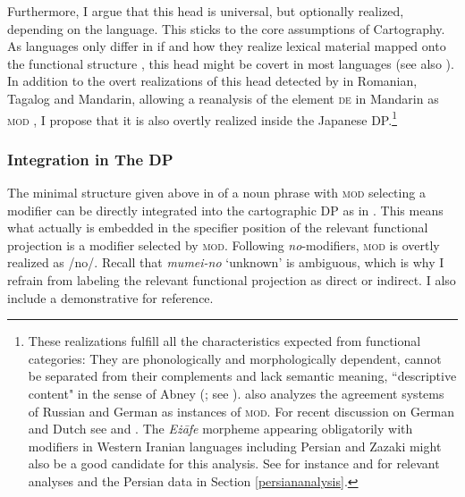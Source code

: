 Furthermore, I argue that this head is universal, but optionally realized, depending on the language. This sticks to the core assumptions of Cartography. As languages only differ in if and how they realize lexical material mapped onto the functional structure \citep{rizzi:1997:the, shlonsky:2004:form, bortolotto:2016:RA, cinriz:2010:carto, cinriz:2016:functional}, this head might be covert in most languages (see also \citealt{richards:2023:finding}). In addition to the overt realizations of this head detected by \citet[§ 2.2 and 2.3]{rubin:1994:mod} in  Romanian,  Tagalog and  Mandarin, allowing a reanalysis of the element \textsc{de} in Mandarin as \textsc{mod} \citep[97–102]{rubin:1994:mod}, I propose that it is also overtly realized inside the Japanese DP.\footnote{These realizations fulfill all the characteristics expected from functional categories: They are phonologically and morphologically dependent, cannot be separated from their complements and lack semantic meaning, ``descriptive content" in the sense of Abney (\citeyear[65–66]{abney:1987:the}; see \citealt[34]{rubin:1994:mod}). \citet[§ 2.2 and 2.3]{rubin:1994:mod} also analyzes the agreement systems of Russian and German as instances of \textsc{mod}. For recent discussion on German and Dutch see \citet{zeijlstra:2020:agree} and \citet{alexeyenko:2021:hff}. The \textit{E{\.z}āfe} morpheme appearing obligatorily with modifiers in Western Iranian languages including Persian and Zazaki might also be a good candidate for this analysis. See for instance \citet{toosarvandani:2014:the, franco:2015:linkers} and \citet{gn:2024:morpho} for relevant analyses and the Persian data in Section \ref{persiananalysis}.} 

\subsubsection{Integration in The DP}

The minimal structure given above in  of a noun phrase with \textsc{mod} selecting a modifier can be directly integrated into the cartographic DP as in . This means what actually is embedded in the specifier position of the relevant functional projection is a modifier selected by \textsc{mod}. Following \textit{no}-modifiers, \textsc{mod} is overtly realized as /no/. Recall that \textit{mumei-no} `unknown’ is ambiguous, which is why I refrain from labeling the relevant functional projection as direct or indirect. I also include a demonstrative for reference.

